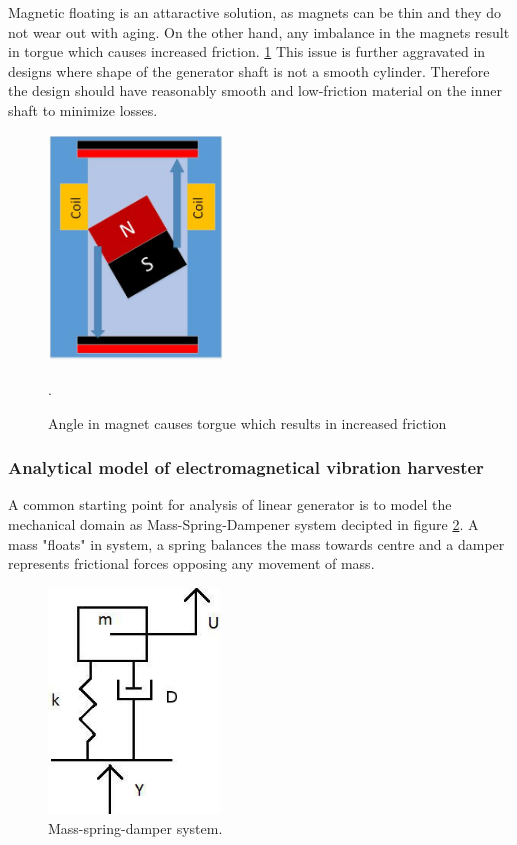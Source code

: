 Magnetic floating is an attaractive solution, as magnets can be thin and they do not wear out with aging. On the other hand, any imbalance in the magnets result in torgue which causes increased friction. \ref{fig:lg_torgue} This issue is further aggravated in designs where shape of the generator shaft is not a smooth cylinder. Therefore the design should have reasonably smooth and low-friction material on the inner shaft to minimize losses.

\begin{figure}[htb]
\begin{center}
\includegraphics[height=6cm]{images/own_dwg/generator_torgue}
\end{center}
\caption{Angle in magnet causes torgue which results in increased friction}.
\label{fig:lg_torgue}
\end{figure}

\subsubsection{Analytical model of electromagnetical vibration harvester}
A common starting point for analysis of linear generator is to model the mechanical domain as Mass-Spring-Dampener system decipted in figure \ref{MSD}. A mass "floats" in system, a spring balances the mass towards centre and a damper represents frictional forces opposing any movement of mass. 

\begin{figure}[htb]
\begin{center}
\includegraphics[height=6cm]{images/own_dwg/MSD.jpg}
\end{center}
\caption{\label{MSD} Mass-spring-damper system.}
\end{figure}

